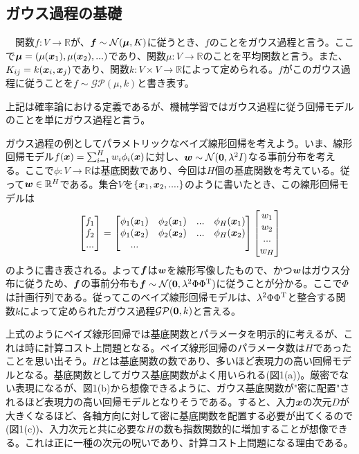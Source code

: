 \documentclass[dvipdfmx, 9pt, a4paper]{jsarticle}
\numberwithin{equation}{section}
\newcommand{\bm}[1]{{\mbox{\boldmath $#1$}}}
\begin{document}
\subsection{ガウス過程の基礎}
\begin{tcolorbox}[title=定義1.1ガウス過程]
　関数$f:V \to \mathbb{R}$が、$\bm f \sim \mathcal{N}(\bm\mu, K)$に従うとき、$f$のことをガウス過程と言う。ここで$\bm \mu=(\mu(\bm x_1), \mu(\bm x_2), ...)$であり、関数$\mu:V \to \mathbb{R}$のことを平均関数と言う。また、$K_{ij}=k(\bm x_i, \bm x_j)$であり、関数$k:V \times V \to \mathbb{R}$によって定められる。$f$がこのガウス過程に従うことを$f \sim \mathcal{GP}(\mu, k)$と書き表す。
\end{tcolorbox}\par
上記は確率論における定義であるが、機械学習ではガウス過程に従う回帰モデルのことを単にガウス過程と言う。\par
ガウス過程の例としてパラメトリックなベイズ線形回帰を考えよう。いま、線形回帰モデル$f(\bm x)=\sum_{i=1}^H w_i\phi_i(\bm x)$に対し、$\bm w \sim \mathcal{N}(\bm 0, \lambda^2I)$なる事前分布を考える。ここで$\phi:V \to \mathbb{R}$は基底関数であり、今回は$H$個の基底関数を考えている。従って$\bm w \in \mathbb{R}^H$である。集合$V$を$\{\bm x_1, \bm x_2, ....\}$のように書いたとき、この線形回帰モデルは
\begin{equation}
\begin{bmatrix}
f_1 \\ f_2 \\ ...
\end{bmatrix}=
\begin{bmatrix}
\phi_1(\bm x_1) & \phi_2(\bm x_1) & ... & \phi_H(\bm x_1) \\
\phi_1(\bm x_2) & \phi_2(\bm x_2) & ... & \phi_H(\bm x_2) \\
... & & &
\end{bmatrix}
\begin{bmatrix}
w_1 \\ w_2 \\ ... \\ w_H
\end{bmatrix} \notag
\end{equation}
のように書き表される。よって$\bm f$は$\bm w$を線形写像したもので、かつ$\bm w$はガウス分布に従うため、$\bm f$の事前分布も$\bm f \sim \mathcal{N}(\bm 0, \lambda^2\Phi \Phi^{\rm T})$に従うことが分かる。ここで$\Phi$は計画行列である。従ってこのベイズ線形回帰モデルは、$\lambda^2\Phi\Phi^{\rm T}$と整合する関数$k$によって定められたガウス過程$\mathcal{GP}(\bm 0, k)$と言える。\par
上式のようにベイズ線形回帰では基底関数とパラメータを明示的に考えるが、これは時に計算コスト上問題となる。ベイズ線形回帰のパラメータ数は$H$であったことを思い出そう。$H$とは基底関数の数であり、多いほど表現力の高い回帰モデルとなる。基底関数としてガウス基底関数がよく用いられる(図1(a))。厳密でない表現になるが、図1(b)から想像できるように、ガウス基底関数が"密に配置"されるほど表現力の高い回帰モデルとなりそうである。すると、入力$\bm x$の次元$D$が大きくなるほど、各軸方向に対して密に基底関数を配置する必要が出てくるので(図1(c))、入力次元と共に必要な$H$の数も指数関数的に増加することが想像できる。これは正に一種の次元の呪いであり、計算コスト上問題になる理由である。\par
\end{document}
